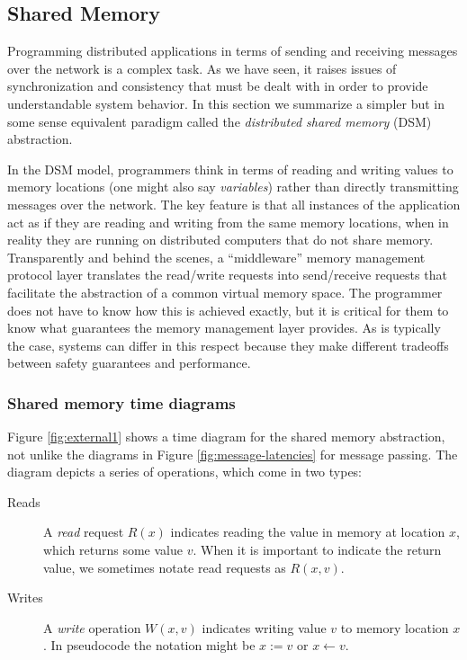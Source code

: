 \documentclass[]             %
{NASA}                       %
\theoremstyle{definition}
\begin{document}
\afterpage{\clearpage}



\newpage
\subsection{Shared Memory}
Programming distributed applications in terms of sending and receiving
messages over the network is a complex task. As we have seen, it
raises issues of synchronization and consistency that must be dealt
with in order to provide understandable system behavior. In this
section we summarize a simpler but in some sense equivalent paradigm
called the \emph{distributed shared memory} (DSM) abstraction.

In the DSM model, programmers think in terms of reading and writing
values to memory locations (one might also say \emph{variables})
rather than directly transmitting messages over the network. The key
feature is that all instances of the application act as if they are
reading and writing from the same memory locations, when in reality
they are running on distributed computers that do not share
memory. Transparently and behind the scenes, a ``middleware'' memory
management protocol layer translates the read/write requests into
send/receive requests that facilitate the abstraction of a common
virtual memory space. The programmer does not have to know how this is
achieved exactly, but it is critical for them to know what guarantees
the memory management layer provides. As is typically the case,
systems can differ in this respect because they make different
tradeoffs between safety guarantees and performance.

\subsubsection{Shared memory time diagrams}
Figure \ref{fig:external1} shows a time diagram for the shared memory
abstraction, not unlike the diagrams in Figure
\ref{fig:message-latencies} for message passing. The diagram depicts a
series of operations, which come in two types:
\begin{description}
  \item[Reads] A \emph{read} request $R(x)$ indicates reading the value
    in memory at location $x$, which returns some value $v$. When it
    is important to indicate the return value, we sometimes notate
    read requests as $R(x, v)$.
  \item[Writes] A \emph{write} operation $W(x, v)$ indicates writing
    value $v$ to memory location $x$. In pseudocode the notation might
    be $x := v$ or $x \leftarrow v$.
\end{description}
\end{document}
